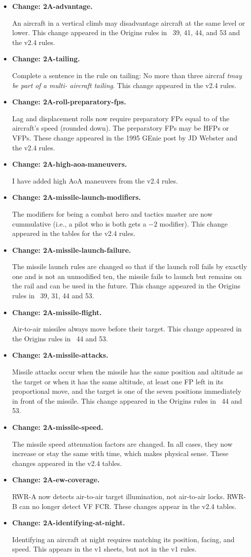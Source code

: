 \documentclass[10pt]{report}
\newcommand{\itemtag}[1]{\item \textbf{Change: #1.}\par}
\begin{document}
\begin{itemize}
    \itemtag{2A-advantage} An aircraft in a vertical climb may disadvantage aircraft at the same level or lower. This change appeared in the Origins rules in {\APJ}~39, 41, 44, and 53 and the v2.4 rules.
    
    \itemtag{2A-tailing} Complete a sentence in the rule on tailing: No more than three aircraf \emph{tmay be part of a multi-
    aircraft tailing}. This change appeared in the v2.4 rules.

    \itemtag{2A-roll-preparatory-fps} Lag and displacement rolls now require preparatory FPs equal to {\onethird} of the aircraft's speed (rounded down). The preparatory FPs may be HFPs or VFPs. These change appeared in the 1995 GEnie post by JD Webster and the v2.4 rules.
    
    \itemtag{2A-high-aoa-maneuvers} I have added high AoA maneuvers from the v2.4 rules.

    \itemtag{2A-missile-launch-modifiers} The modifiers for being a combat hero and tactics master are now cummulative (i.e., a pilot who is both gets a $-2$ modifier). This change appeared in the tables for the v2.4 rules.
    
    \itemtag{2A-missile-launch-failure} The missile launch rules are changed so that if the launch roll fails by exactly one and is not an unmodified ten, the missile fails to launch but remains on the rail and can be used in the future. This change appeared in the Origins rules in \APJ~39, 31, 44 and 53.

    \itemtag{2A-missile-flight} Air-to-air missiles always move before their target. This change appeared in the Origins rules in \APJ~44 and 53.

    \itemtag{2A-missile-attacks} Missile attacks occur when the missile has the same position and altitude as the target or when it has the same altitude, at least one FP left in its proportional move, and the target is one of the seven positions immediately in front of the missile. This change appeared in the Origins rules in \APJ~44 and 53.

    \itemtag{2A-missile-speed} The missile speed attenuation factors are changed. In all cases, they now increase or stay the same with time, which makes physical sense. These changes appeared in the v2.4 tables.

    \itemtag{2A-ew-coverage} RWR-A now detects air-to-air target illumination, not air-to-air locks. RWR-B can no longer detect VF FCR. These changes appear in the v2.4 tables.
    
    \itemtag{2A-identifying-at-night} Identifying an aircraft at night requires matching its position, facing, and speed. This appears in the v1 sheets, but not in the v1 rules.

\end{itemize}
\end{document}
